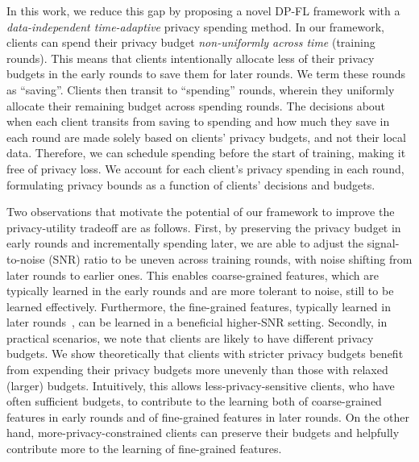 In this work, we reduce this gap by proposing a novel DP-FL framework with a \textit{data-independent time-adaptive} privacy spending method. In our framework, clients can spend their privacy budget \textit{non-uniformly across time} (training rounds). This means that clients intentionally allocate less of their privacy budgets in the early rounds to save them for later rounds. We term these rounds as ``saving''. Clients then transit to ``spending'' rounds, wherein they uniformly allocate their remaining budget across spending rounds. The decisions about when each client transits from saving to spending and how much they save in each round are made solely based on clients' privacy budgets, and not their local data. Therefore, we can schedule spending before the start of training, making it free of privacy loss. We account for each client's privacy spending in each round, formulating privacy bounds as a function of clients' decisions and budgets.


Two observations that motivate the potential of our framework to improve the privacy-utility tradeoff are as follows. First, by preserving the privacy budget in early rounds and incrementally spending later, we are able to adjust the signal-to-noise (SNR) ratio to be uneven across training rounds, with noise shifting from later rounds to earlier ones. This enables coarse-grained features, which are typically learned in the early rounds and are more tolerant to noise, still to be learned effectively. Furthermore, the fine-grained features, typically learned in later rounds~\citep{dziedzic2019band, raghu2017svcca, shwartz2017opening}, can be learned in a beneficial higher-SNR setting. Secondly, in practical scenarios, we note that clients are likely to have different privacy budgets. We show theoretically that clients with stricter privacy budgets benefit from expending their privacy budgets more unevenly than those with relaxed (larger) budgets. Intuitively, this allows less-privacy-sensitive clients, who have often sufficient budgets, to contribute to the learning both of coarse-grained features in early rounds and of fine-grained features in later rounds. On the other hand, more-privacy-constrained clients can preserve their budgets and helpfully contribute more to the learning of fine-grained features. 

